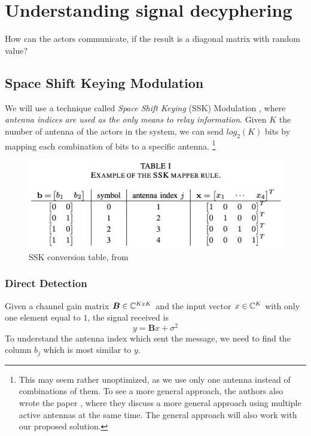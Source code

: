 \section{Understanding signal decyphering}
How can the actors communicate, if the result is a diagonal matrix with random value?

\subsection{Space Shift Keying Modulation
}

We will use a technique called \textit{Space Shift Keying} (SSK) Modulation \cite{5165332}, where \textit{antenna indices are used as the only means to relay information}. Given $K$ the number of antenna of the actors in the system, we can send $log_2(K)$ bits by mapping each combination of bits to a specific antenna.
\footnote{This may seem rather unoptimized, as we use only one antenna instead of combinations of them. To see a more general approach, the authors also wrote the paper \cite{4699782}, where they discuss a more general approach using multiple active antennas at the same time. The general approach will also work with our proposed solution.}

\begin{figure}[H]
  \centering
  \includegraphics[width=\linewidth]{imgs/ssk_conversion_table.png}
  \caption{SSK conversion table, from \cite{5165332}}
  \label{fig:ssk_conversion_table}
\end{figure}

\subsubsection{Direct Detection}
Given a channel gain matrix $\bm{B} \in \mathbb{C}^{KxK}$ and the input vector $x \in \mathbb{C}^K$ with only one element equal to $1$, the signal received is
\begin{equation}
  y = \bm{B}x + \sigma^2
\end{equation}
To understand the antenna index which sent the message, we need to find the column $b_j$ which is most similar to $y$.

